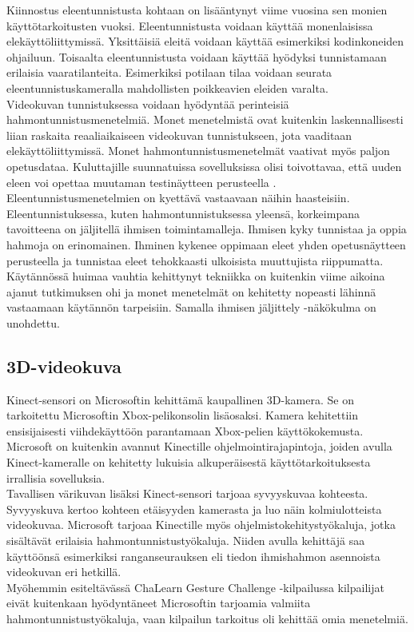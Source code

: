 Kiinnostus eleentunnistusta kohtaan on lisääntynyt viime vuosina sen monien käyttötarkoitusten vuoksi.
Eleentunnistusta voidaan käyttää monenlaisissa elekäyttöliittymissä.  Yksittäisiä eleitä voidaan 
käyttää esimerkiksi kodinkoneiden ohjailuun. \citep {1251144} Toisaalta eleentunnistusta voidaan käyttää hyödyksi tunnistamaan
erilaisia vaaratilanteita. Esimerkiksi potilaan tilaa voidaan seurata eleentunnistuskameralla 
mahdollisten poikkeavien eleiden varalta.\citep{chalearn2}\\

Videokuvan tunnistuksessa voidaan hyödyntää perinteisiä hahmontunnistusmenetelmiä. Monet menetelmistä ovat kuitenkin laskennallisesti liian raskaita 
reaaliaikaiseen videokuvan tunnistukseen, jota vaaditaan elekäyttöliittymissä. \citep {1251144}
Monet hahmontunnistusmenetelmät vaativat myös paljon opetusdataa. Kuluttajille suunnatuissa
sovelluksissa olisi toivottavaa, että uuden eleen voi opettaa muutaman testinäytteen perusteella \citep {1251144}.
Eleentunnistusmenetelmien on kyettävä vastaavaan näihin haasteisiin.\\

Eleentunnistuksessa, kuten hahmontunnistuksessa yleensä, korkeimpana tavoitteena on jäljitellä ihmisen toimintamalleja.
Ihmisen kyky tunnistaa ja oppia hahmoja on erinomainen. Ihminen kykenee oppimaan eleet yhden opetusnäytteen perusteella 
ja tunnistaa eleet tehokkaasti ulkoisista muuttujista riippumatta. Käytännössä huimaa vauhtia kehittynyt tekniikka on kuitenkin
viime aikoina ajanut tutkimuksen ohi ja monet menetelmät on kehitetty nopeasti lähinnä vastaamaan käytännön tarpeisiin. Samalla 
ihmisen jäljittely -näkökulma on unohdettu.
\citep{chalearn2}

\subsection{3D-videokuva}
Kinect-sensori on Microsoftin kehittämä kaupallinen 3D-kamera. Se on tarkoitettu Microsoftin Xbox-pelikonsolin lisäosaksi.
Kamera kehitettiin ensisijaisesti viihdekäyttöön parantamaan Xbox-pelien käyttökokemusta. Microsoft on kuitenkin avannut
Kinectille ohjelmointirajapintoja, joiden avulla Kinect-kameralle on kehitetty lukuisia alkuperäisestä käyttötarkoituksesta 
irrallisia sovelluksia.\citep{kinect}\\

Tavallisen värikuvan lisäksi Kinect-sensori tarjoaa syvyyskuvaa kohteesta. Syvyyskuva kertoo kohteen etäisyyden kamerasta ja luo näin kolmiulotteista videokuvaa. 
Microsoft tarjoaa Kinectille myös ohjelmistokehitystyökaluja, jotka sisältävät erilaisia hahmontunnistustyökaluja.
Niiden avulla kehittäjä saa käyttöönsä esimerkiksi ranganseurauksen eli tiedon ihmishahmon asennoista videokuvan eri hetkillä. \citep{kinect}\\
Myöhemmin esiteltävässä ChaLearn Gesture Challenge -kilpailussa kilpailijat eivät kuitenkaan hyödyntäneet Microsoftin tarjoamia 
valmiita hahmontunnistustyökaluja, vaan kilpailun tarkoitus oli kehittää omia menetelmiä. \\


